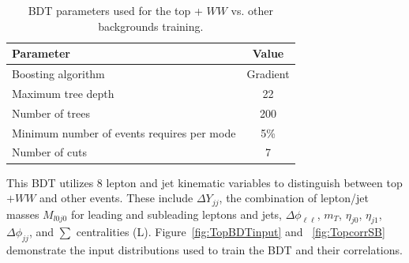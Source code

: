 \begin{table}[h!]
\centering
\begin{tabular}{|l|c|}
\hline
Parameter                                    & Value     \\
\hline
Boosting algorithm                           &  Gradient  \\
Maximum tree depth                           &  22       \\
Number of trees                              &  200     \\
Minimum number of events requires per mode   &  5\%      \\
Number of cuts                               &  7        \\
\hline
\end{tabular}
\caption{BDT parameters used for the top + $WW$ vs. other backgrounds training.} 
\label{tab:TopBDTparameters}
\end{table}

This BDT utilizes 8 lepton and jet kinematic variables to distinguish between top$+WW$ and other events. These include $\Delta Y_{jj}$, the combination of lepton/jet masses $M_{l0j0}$ for leading and subleading leptons and jets, $\Delta \phi_{\ell\ell}$, $m_T$, $\eta_{j0}$, $\eta_{j1}$, $\Delta \phi_{jj}$, and $\sum$ centralities (L). Figure~\ref{fig:TopBDTinput} and ~\ref{fig:TopcorrSB} demonstrate the input distributions used to train the BDT and their correlations.

